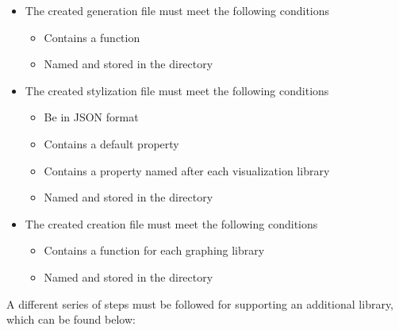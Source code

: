 \begin{itemize}
    \item The created generation file must meet the following conditions
    \begin{itemize}
        \item Contains a  function
        \item Named  and stored in the  directory
    \end{itemize}
    \item The created stylization file must meet the following conditions
    \begin{itemize}
        \item Be in JSON format
        \item Contains a default property
        \item Contains a property named after each visualization library
        \item Named  and stored in the  directory
    \end{itemize}
    \item The created creation file must meet the following conditions
        \begin{itemize}
            \item Contains a  function for each graphing library
            \item Named  and stored in the  directory
        \end{itemize}
\end{itemize}

A different series of steps must be followed for supporting an additional library, which can be found below:

